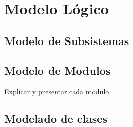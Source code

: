 \chapter{Modelo Lógico} 

\section{Modelo de Subsistemas}

\section{Modelo de Modulos}

Explicar y presentar cada modulo

\section{Modelado de clases}


